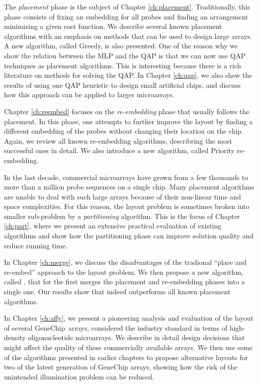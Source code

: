 The \emph{placement} phase is the subject of Chapter \ref{ch:placement}.
Traditionally, this phase consists of fixing an embedding for all probes and
finding an arrangement minimizing a given cost function. We describe several
known placement algorithms with an emphasis on methods that can be used to
design large arrays. A new algorithm, called Greedy, is also presented. One of
the reason why we show the relation between the MLP and the QAP is that we can
now use QAP techniques as placement algorithms. This is interesting because
there is a rich literature on methods for solving the QAP. In Chapter
\ref{ch:qap}, we also show the results of using one QAP heuristic to design
small artificial chips, and discuss how this approach can be applied to larger
microarrays.

Chapter \ref{ch:reembed} focuses on the \emph{re-embedding} phase that usually
follows the placement. In this phase, one attempts to further improve the layout
by finding a different embedding of the probes without changing their location
on the chip. Again, we review all known re-embedding algorithms, describring the
most successful ones in detail. We also introduce a new algorithm, called
Priority re-embedding.

In the last decade, commercial microarrays have grown from a few thousands to
more than a million probe sequences on a single chip. Many placement algorithms
are unable to deal with such large arrays because of their non-linear time and
space complexities. For this reason, the layout problem is sometimes broken into
smaller sub-problem by a \emph{partitioning} algorithm. This is the focus of
Chapter \ref{ch:part}, where we present an extensive practical evaluation of
existing algorithms and show how the partitioning phase can improve solution
quality and reduce running time.

In Chapter \ref{ch:merge}, we discuss the disadvantages of the tradional ``place
and re-embed'' approach to the layout problem. We then propose a new algorithm,
called \Greedyplus, that for the first merges the placement and re-embedding
phases into a single one. Our results show that \Greedyplus indeed outperforms
all known placement algorithms.

In Chapter \ref{ch:affy}, we present a pioneering analysis and evaluation of the
layout of several GeneChip\textR\ arrays, considered the industry standard in
terms of high-density oligonucleotide microarrays. We describe in detail design
decisions that might affect the quality of these commercially available arrays.
We then use some of the algorithms presented in earlier chapters to propose
alternative layouts for two of the latest generation of GeneChip arrays, showing
how the risk of the unintended illumination problem can be reduced.

